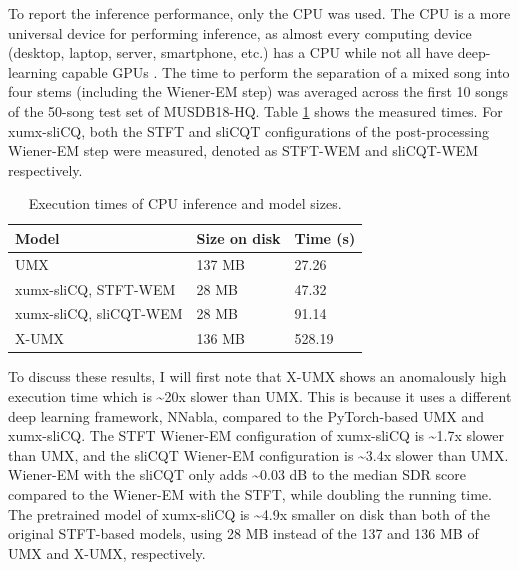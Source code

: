 \documentclass[report.tex]{subfiles}
\begin{document}
To report the inference performance, only the CPU was used. The CPU is a more universal device for performing inference, as almost every computing device (desktop, laptop, server, smartphone, etc.) has a CPU while not all have deep-learning capable GPUs \parencite{deepcpuinf, deepcpuinf2}. The time to perform the separation of a mixed song into four stems (including the Wiener-EM step) was averaged across the first 10 songs of the 50-song test set of MUSDB18-HQ. Table \ref{table:infperf} shows the measured times. For xumx-sliCQ, both the STFT and sliCQT configurations of the post-processing Wiener-EM step were measured, denoted as STFT-WEM and sliCQT-WEM respectively.

\begin{table}[ht]
	\centering
	\caption{Execution times of CPU inference and model sizes.}
	\label{table:infperf}
	\begin{tabular}{ |l|l|l| }
	 \hline
		Model & Size on disk & Time (s) \\
	 \hline
	 \hline
		UMX & 137 MB & 27.26 \\
	 \hline
		xumx-sliCQ, STFT-WEM & 28 MB & 47.32 \\
	 \hline
		xumx-sliCQ, sliCQT-WEM & 28 MB & 91.14 \\
	 \hline
		X-UMX & 136 MB & 528.19 \\
	 \hline
\end{tabular}
\end{table}

To discuss these results, I will first note that X-UMX shows an anomalously high execution time which is \textasciitilde20x slower than UMX. This is because it uses a different deep learning framework, NNabla, compared to the PyTorch-based UMX and xumx-sliCQ. The STFT Wiener-EM configuration of xumx-sliCQ is \textasciitilde1.7x slower than UMX, and the sliCQT Wiener-EM configuration is \textasciitilde3.4x slower than UMX. Wiener-EM with the sliCQT only adds \textasciitilde0.03 dB to the median SDR score compared to the Wiener-EM with the STFT, while doubling the running time. The pretrained model of xumx-sliCQ is \textasciitilde4.9x smaller on disk than both of the original STFT-based models, using 28 MB instead of the 137 and 136 MB of UMX and X-UMX, respectively.
\end{document}
